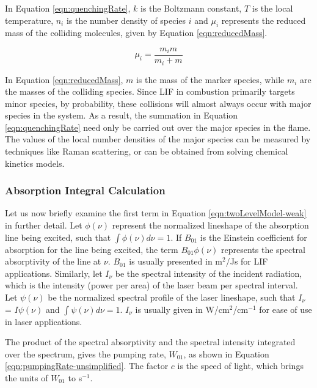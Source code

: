 In Equation \ref{eqn:quenchingRate}, \(k\) is the Boltzmann constant, \(T\) is the local temperature, \(n_i\) is the number density of species \(i\) and \(\mu_i\) represents the reduced mass of the colliding molecules, given by Equation \ref{eqn:reducedMass}.

\begin{equation}
  \mu_i = \frac{ m_i m }{ m_i + m }
  \label{eqn:reducedMass}
\end{equation}

In Equation \ref{eqn:reducedMass}, \(m\) is the mass of the marker species, while \(m_i\) are the masses of the colliding species.
Since LIF in combustion primarily targets minor species, by probability, these collisions will almost always occur with major species in the system.
As a result, the summation in Equation \ref{eqn:quenchingRate} need only be carried out over the major species in the flame.
The values of the local number densities of the major species can be measured by techniques like Raman scattering, or can be obtained from solving chemical kinetics models.

\subsubsection{Absorption Integral Calculation}
\label{subsubsec:basic-model-absorption-integral-calculation}

Let us now briefly examine the first term in Equation \ref{eqn:twoLevelModel-weak} in further detail.
Let \(\phi(\nu)\) represent the normalized lineshape of the absorption line being excited, such that \(\int \phi(\nu) d\nu = 1\).
If \(B_{01}\) is the Einstein coefficient for absorption for the line being excited, the term \(B_{01}\phi(\nu)\) represents the spectral absorptivity of the line at \(\nu\).
\(B_{01}\) is usually presented in m\(^2\)/Js for LIF applications.
Similarly, let \(I_\nu\) be the spectral intensity of the incident radiation, which is the intensity (power per area) of the laser beam per spectral interval.
Let \(\psi(\nu)\) be the normalized spectral profile of the laser lineshape, such that \(I_\nu\) = \(I \psi(\nu)\) and \(\int \psi(\nu) d\nu = 1\).
\(I_\nu\) is usually given in W/cm\(^2\)/cm\(^{-1}\) for ease of use in laser applications.

The product of the spectral absorptivity and the spectral intensity integrated over the spectrum, gives the pumping rate, \(W_{01}\), as shown in Equation \ref{eqn:pumpingRate-unsimplified}.
The factor \(c\) is the speed of light, which brings the units of \(W_{01}\) to s\(^{-1}\).

